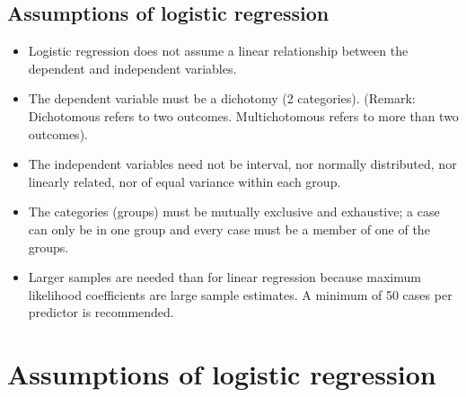 \documentclass[a4paper,12pt]{article}
\begin{document}
\subsection{Assumptions of logistic regression}
\begin{itemize}
\item Logistic regression does not assume a linear relationship between the dependent and
independent variables.
\item The dependent variable must be a dichotomy (2 categories).
(Remark: Dichotomous refers to two outcomes. Multichotomous refers to more than two outcomes).
\item The independent variables need not be interval, nor normally distributed, nor linearly
related, nor of equal variance within each group.
\item The categories (groups) must be mutually exclusive and exhaustive; a case can only be
in one group and every case must be a member of one of the groups.
\item Larger samples are needed than for linear regression because maximum likelihood
coefficients are large sample estimates. A minimum of 50 cases per predictor is
recommended.
\end{itemize}
\section{Assumptions of logistic regression}
\end{document}
